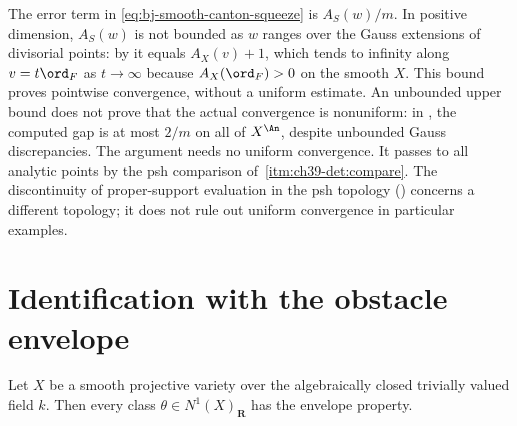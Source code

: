 \begin{remark}
\label{rem:ch40-no-uniform-discrepancy}
The error term in \eqref{eq:bj-smooth-canton-squeeze} is $A_S(w)/m$.
In positive dimension, $A_S(w)$ is not bounded as $w$ ranges over the Gauss extensions of
divisorial points: by  it equals
$A_X(v)+1$, which tends to infinity along $v=t\ord_F$ as $t\to\infty$
because $A_X(\ord_F)>0$ on the smooth $X$.
This bound proves pointwise convergence, without a uniform estimate.
An unbounded upper bound does not prove that the actual convergence is
nonuniform: in , the computed gap is at most
$2/m$ on all of $X^{\An}$, despite unbounded Gauss discrepancies.
The argument needs no uniform convergence.  It passes to all analytic
points by the psh comparison of
\,\cref{itm:ch39-det:compare}.
The discontinuity of proper-support evaluation in the psh topology
() concerns a different topology;
it does not rule out uniform convergence in particular examples.
\end{remark}

\section{Identification with the obstacle envelope}
\label{sec:ch40-identification}

\begin{theorem}\label{thm:bj-smooth-envelope}
Let $X$ be a smooth projective variety over the algebraically closed
trivially valued field $k$.  Then every class
$\theta\in N^1(X)_{\mathbf R}$ has the envelope property.
\end{theorem}

